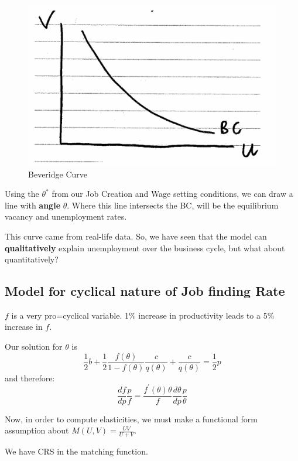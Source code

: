 \documentclass[11pt]{article}
\begin{document}
 \begin{figure}[h]
     \centering
     \includegraphics[width=12cm]{photos/bc curve.png}
     \caption{Beveridge Curve}
     \label{fig:BC curve}
 \end{figure}
Using the $\theta^*$ from our Job Creation and Wage setting conditions, we can draw a line with \textbf{angle} $\theta$. Where this line intersects the BC, will be the equilibrium vacancy and unemployment rates.

 This curve came from real-life data. So, we have seen that the model can \textbf{qualitatively} explain unemployment over the business cycle, but what about quantitatively?

 \subsection{Model for cyclical nature of Job finding Rate}


$f$ is a very pro=cyclical variable. 1\% increase in productivity leads to a 5\% increase in $f$.

Our solution for $\theta$ is
\begin{equation}
\frac{1}{2} b+\frac{1}{2} \frac{f(\theta)}{1-f(\theta)} \frac{c}{q(\theta)}+\frac{c}{q(\theta)}=\frac{1}{2} p
\end{equation}
and therefore:
\begin{equation}
\frac{d f}{d p} \frac{p}{f}=\frac{f^{\prime}(\theta) \theta}{f} \frac{d \theta}{d p} \frac{p}{\theta}
\end{equation}

Now, in order to compute elasticities, we must make a functional form assumption about $M(U,V) = \frac{UV}{U+V}$.
\begin{note}
    We have CRS in the matching function.
\end{note}
\end{document}
